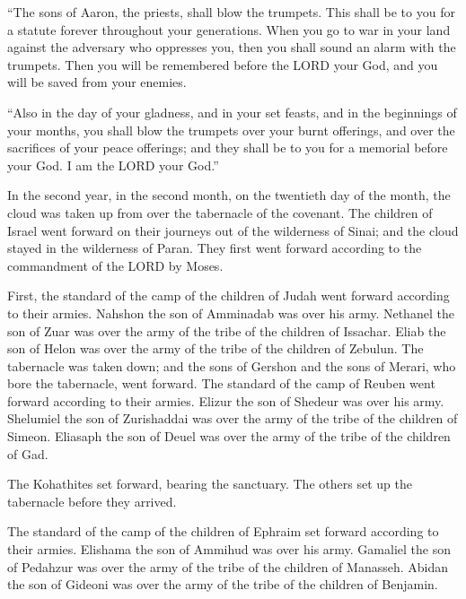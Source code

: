  ``The sons of Aaron, the priests, shall blow the trumpets.
This shall be to you for a statute forever throughout your generations.
 When you go to war in your land against the adversary who
oppresses you, then you shall sound an alarm with the trumpets. Then you
will be remembered before the LORD your God, and you will be saved from
your enemies.

 ``Also in the day of your gladness, and in your set
feasts, and in the beginnings of your months, you shall blow the
trumpets over your burnt offerings, and over the sacrifices of your
peace offerings; and they shall be to you for a memorial before your
God. I am the LORD your God.''

 In the second year, in the second month, on the twentieth
day of the month, the cloud was taken up from over the tabernacle of the
covenant.  The children of Israel went forward on their
journeys out of the wilderness of Sinai; and the cloud stayed in the
wilderness of Paran.  They first went forward according to
the commandment of the LORD by Moses.

 First, the standard of the camp of the children of Judah
went forward according to their armies. Nahshon the son of Amminadab was
over his army.  Nethanel the son of Zuar was over the army
of the tribe of the children of Issachar.  Eliab the son of
Helon was over the army of the tribe of the children of Zebulun.
 The tabernacle was taken down; and the sons of Gershon and
the sons of Merari, who bore the tabernacle, went forward. 
The standard of the camp of Reuben went forward according to their
armies. Elizur the son of Shedeur was over his army. 
Shelumiel the son of Zurishaddai was over the army of the tribe of the
children of Simeon.  Eliasaph the son of Deuel was over the
army of the tribe of the children of Gad.

 The Kohathites set forward, bearing the sanctuary. The
others set up the tabernacle before they arrived.

 The standard of the camp of the children of Ephraim set
forward according to their armies. Elishama the son of Ammihud was over
his army.  Gamaliel the son of Pedahzur was over the army
of the tribe of the children of Manasseh.  Abidan the son
of Gideoni was over the army of the tribe of the children of Benjamin.

